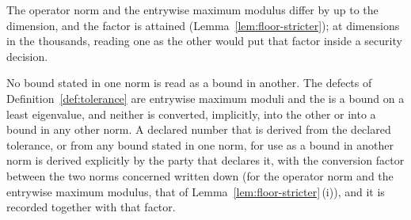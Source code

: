 
The operator norm and the entrywise maximum modulus differ by up to the
dimension, and the factor is attained (Lemma~\ref{lem:floor-stricter}); at
dimensions in the thousands, reading one as the other would put that factor
inside a security decision.

\begin{requirement}\label{req:norm-conversion}
No bound stated in one norm is read as a bound in another. The defects of
Definition~\ref{def:tolerance} are entrywise maximum moduli and the
 is a bound on a least eigenvalue, and neither is
converted, implicitly, into the other or into a bound in any other norm.
A declared number that is
derived from the declared tolerance, or from any bound stated in one norm, for
use as a bound in another norm is derived explicitly by the party that
declares it, with the conversion factor between the two norms concerned
written down (for the operator norm and the entrywise maximum modulus, that of
Lemma~\ref{lem:floor-stricter}\,(i)), and it is recorded together with that
factor.
\end{requirement}
